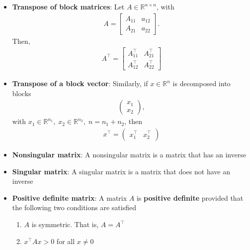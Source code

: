 \documentclass{report}
\begin{document}
\begin{itemize}
    \item \textbf{Transpose of block matrices}: Let $A \in \mathbb{R}^{n\times n}$, with
        \begin{align*}
            A  = \begin{bmatrix} A_{11} & a_{12} \\ A_{21} & a_{22} \end{bmatrix}
        .\end{align*}
        Then, 
        \begin{align*}
            A^{\top} = \begin{bmatrix}
                A_{11}^{\top} & A_{21}^{\top} \\ A_{12}^{\top} & A_{22}^{\top}
            \end{bmatrix}
        \end{align*}
    \item \textbf{Transpose of a block vector}: Similarly, if $ x \in \mathbb{R}^{n}$ is decomposed into blocks
        \begin{align*}
            \begin{pmatrix} x_{1} \\ x_{2} \end{pmatrix}
        ,\end{align*}
        with $x_{1} \in \mathbb{R}^{n_{1}} ,\; x_{2} \in \mathbb{R}^{n_{2}},\; n = n_{1} + n_{2}$, then
        \begin{align*}
            x^{\top} = \begin{pmatrix} x_{1}^{\top} & x_{2}^{\top} \end{pmatrix}
        \end{align*}

    \item \textbf{Nonsingular matrix}: A nonsingular matrix is a matrix that has an inverse
    \item \textbf{Singular matrix}: A singular matrix is a matrix that does not have an inverse
            \item \textbf{Positive definite matrix}: A matrix $A$ is \textbf{positive definite} provided that the following two conditions are satisfied
            \begin{enumerate}
                \item $A$ is symmetric. That is, $A = A^{\top} $
                \item $x^{\top}Ax > 0 $ for all $x\ne 0$
            \end{enumerate}


\end{itemize}
\end{document}
